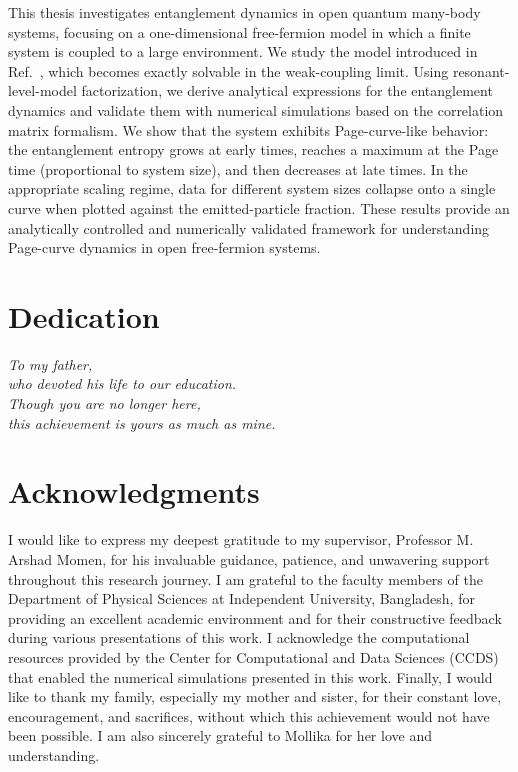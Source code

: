 \documentclass[12pt,oneside,openright]{report}
\theoremstyle{definition}
\theoremstyle{plain}
\theoremstyle{remark}
\begin{document}
This thesis investigates entanglement dynamics in open quantum many-body systems, focusing on a one-dimensional free-fermion model in which a finite system is coupled to a large environment. We study the model introduced in Ref.~\cite{Kehrein_2024}, which becomes exactly solvable in the weak-coupling limit. Using resonant-level-model factorization, we derive analytical expressions for the entanglement dynamics and validate them with numerical simulations based on the correlation matrix formalism. We show that the system exhibits Page-curve-like behavior: the entanglement entropy grows at early times, reaches a maximum at the Page time (proportional to system size), and then decreases at late times. In the appropriate scaling regime, data for different system sizes collapse onto a single curve when plotted against the emitted-particle fraction. These results provide an analytically controlled and numerically validated framework for understanding Page-curve dynamics in open free-fermion systems.

\cleardoublepage

\chapter*{Dedication}

\vspace*{0.25\textheight}
\begin{center}
{\Large\itshape
To my father,\\
who devoted his life to our education.\\
Though you are no longer here,\\
this achievement is yours as much as mine.}
\end{center}

\cleardoublepage


\chapter*{Acknowledgments}

I would like to express my deepest gratitude to my supervisor, Professor M. Arshad Momen,
for his invaluable guidance, patience, and unwavering support throughout this research journey.
I am grateful to the faculty members of the Department of Physical Sciences at Independent University, Bangladesh,
for providing an excellent academic environment and for their constructive feedback during various presentations of this work.
I acknowledge the computational resources provided by the Center for Computational and Data Sciences (CCDS) that enabled the numerical simulations presented in this work.
Finally, I would like to thank my family, especially my mother and sister, for their constant love, encouragement, and sacrifices, without which this achievement would not have been possible. I am also sincerely grateful to Mollika for her love and understanding.
\end{document}
